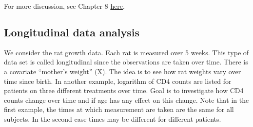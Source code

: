 \documentclass[12pt,]{book}
\newenvironment{Shaded}{\begin{snugshade}}{\end{snugshade}}
\newcommand{\KeywordTok}[1]{\textcolor[rgb]{0.13,0.29,0.53}{\textbf{#1}}}
\newcommand{\DataTypeTok}[1]{\textcolor[rgb]{0.13,0.29,0.53}{#1}}
\newcommand{\DecValTok}[1]{\textcolor[rgb]{0.00,0.00,0.81}{#1}}
\newcommand{\StringTok}[1]{\textcolor[rgb]{0.31,0.60,0.02}{#1}}
\newcommand{\CommentTok}[1]{\textcolor[rgb]{0.56,0.35,0.01}{\textit{#1}}}
\newcommand{\OtherTok}[1]{\textcolor[rgb]{0.56,0.35,0.01}{#1}}
\newcommand{\ControlFlowTok}[1]{\textcolor[rgb]{0.13,0.29,0.53}{\textbf{#1}}}
\newcommand{\OperatorTok}[1]{\textcolor[rgb]{0.81,0.36,0.00}{\textbf{#1}}}
\newcommand{\ErrorTok}[1]{\textcolor[rgb]{0.64,0.00,0.00}{\textbf{#1}}}
\newcommand{\NormalTok}[1]{#1}
\begin{document}
For more discussion, see Chapter 8
\href{https://stat.ethz.ch/~meier/teaching/anova/split-plot-designs.html\#}{here}.

\subsection{Longitudinal data
analysis}\label{longitudinal-data-analysis}

We consider the rat growth data. Each rat is measured over 5 weeks. This
type of data set is called longitudinal since the observations are taken
over time. There is a covariate ``mother's weight'' (X). The idea is to
see how rat weights vary over time since birth. In another example,
logarithm of CD4 counts are listed for patients on three different
treatments over time. Goal is to investigate how CD4 counts change over
time and if age has any effect on this change. Note that in the first
example, the times at which measurement are taken are the same for all
subjects. In the second case times may be different for different
patients.

\begin{Shaded}
\end{Shaded}
\end{document}
